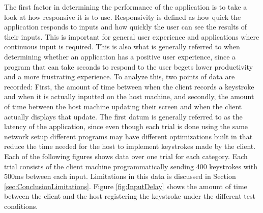 The first factor in determining the performance of the application is to take a look at how responsive it is to use.
Responsivity is defined as how quick the application responds to inputs and how quickly the user can see the results of their inputs.
This is important for general user experience and applications where continuous input is required.
This is also what is generally referred to when determining whether an application has a positive user experience, since a program that can take seconds to respond to the user begets lower productivity and a more frustrating experience.
To analyze this, two points of data are recorded: First, the amount of time between when the client records a keystroke and when it is actually inputted on the host machine, and secondly, the amount of time between the host machine updating their screen and when the client actually displays that update.
The first datum is generally referred to as the latency of the application, since even though each trial is done using the same network setup different programs may have different optimizations built in that reduce the time needed for the host to implement keystrokes made by the client.
Each of the following figures shows data over one trial for each category.
Each trial consists of the client machine programmatically sending 400 keystrokes with 500ms between each input.
Limitations in this data is discussed in Section \ref{sec:ConclusionLimitations}.
Figure \ref{fig:InputDelay} shows the amount of time between the client and the host registering the keystroke under the different test conditions.

